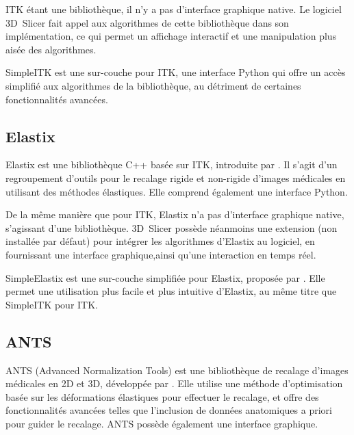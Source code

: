 \documentclass{article}
\begin{document}
{{        \bigskip

        ITK étant une bibliothèque, il n'y a pas d'interface graphique native. Le logiciel 3D~Slicer fait appel aux algorithmes de cette bibliothèque dans son implémentation, ce qui permet un affichage interactif et une manipulation plus aisée des algorithmes.

        \bigskip

        SimpleITK \citep{simpleitk} est une sur-couche pour ITK, une interface Python qui offre un accès simplifié aux algorithmes de la bibliothèque, au détriment de certaines fonctionnalités avancées.
    }

    {
        \bigskip
        \subsection{Elastix}
        \label{subsec:elastix-related-work}

        Elastix est une bibliothèque C++ basée sur ITK, introduite par \cite{elastix}. Il s'agit d'un regroupement d'outils pour le recalage rigide et non-rigide d'images médicales en utilisant des méthodes élastiques. Elle comprend également une interface Python.

        \bigskip

        De la même manière que pour ITK, Elastix n'a pas d'interface graphique native, s'agissant d'une bibliothèque. 3D~Slicer possède néanmoins une extension (non installée par défaut) pour intégrer les algorithmes d'Elastix au logiciel, en fournissant une interface graphique,ainsi qu'une interaction en temps réel.

        \bigskip

        SimpleElastix est une sur-couche simplifiée pour Elastix, proposée par \cite{simpleelastix}. Elle permet une utilisation plus facile et plus intuitive d'Elastix, au même titre que SimpleITK pour ITK.
    }

    {
        \bigskip
        \subsection{ANTS}
        \label{subsec:ants-related-work}

        ANTS (Advanced Normalization Tools) est une bibliothèque de recalage d'images médicales en 2D et 3D, développée par \cite{ants}. Elle utilise une méthode d'optimisation basée sur les déformations élastiques pour effectuer le recalage, et offre des fonctionnalités avancées telles que l'inclusion de données anatomiques a priori pour guider le recalage. ANTS possède également une interface graphique.

}}
\end{document}
